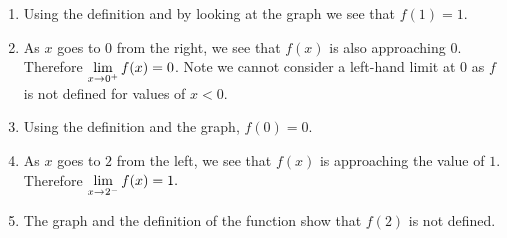 \begin{example}
\begin{enumerate}[1)]
\item Using the definition and by looking at the graph we see that $f(1) = 1$.

\item As $x$ goes to $0$ from the right, we see that $f(x)$ is also approaching $0$. Therefore $\displaystyle \lim_{x\to 0^+} f(x)=0$. Note we cannot consider a left-hand limit at $0$ as $f$ is not defined for values of $x<0$.

\item Using the definition and the graph, $f(0) = 0$.

\item As $x$ goes to $2$ from the left, we see that $f(x)$ is approaching the value of $1$. Therefore $\displaystyle \lim_{x\to 2^-} f(x)=1.$

\item The graph and the definition of the function show that $f(2)$ is not defined.
\end{enumerate}
\end{example}


